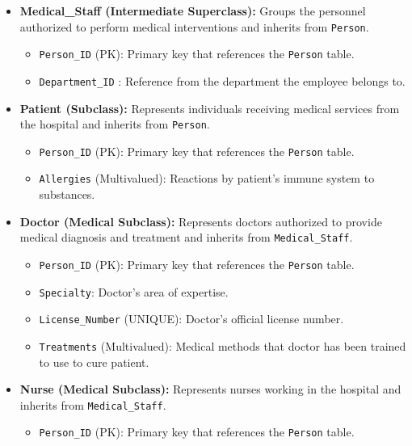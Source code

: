 \documentclass[12pt,a4paper]{article}
\begin{document}
\begin{itemize}[label=\textbf{--}]
	\item \textbf{Medical\_Staff (Intermediate Superclass):} Groups the personnel authorized to perform medical interventions and inherits from \texttt{Person}.
	      \begin{itemize}[label=$\bullet$]
		      \item \texttt{Person\_ID} (PK): Primary key that references the \texttt{Person} table.
		      \item \texttt{Department\_ID} : Reference from the department the employee belongs to.
	      \end{itemize}

	\item \textbf{Patient (Subclass):} Represents individuals receiving medical services from the hospital and inherits from \texttt{Person}.
	      \begin{itemize}[label=$\bullet$]
		      \item \texttt{Person\_ID} (PK): Primary key that references the \texttt{Person} table.
		      \item \texttt{Allergies} (Multivalued): Reactions by patient's immune system to substances.
	      \end{itemize}

	\item \textbf{Doctor (Medical Subclass):} Represents doctors authorized to provide medical diagnosis and treatment and inherits from \texttt{Medical\_Staff}.
	      \begin{itemize}[label=$\bullet$]
		      \item \texttt{Person\_ID} (PK): Primary key that references the \texttt{Person} table.
		      \item \texttt{Specialty}: Doctor's area of expertise.
		      \item \texttt{License\_Number} (UNIQUE): Doctor's official license number.
		      \item \texttt{Treatments} (Multivalued): Medical methods that doctor has been trained to use to cure patient.
	      \end{itemize}

	\item \textbf{Nurse (Medical Subclass):} Represents nurses working in the hospital and inherits from \texttt{Medical\_Staff}.

	      \begin{itemize}[label=$\bullet$]
		      \item \texttt{Person\_ID} (PK): Primary key that references the \texttt{Person} table.
	      \end{itemize}


\end{itemize}
\end{document}
